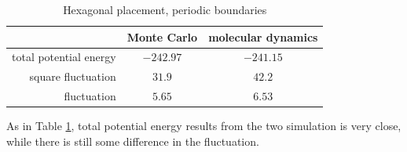 \documentclass[UTF8,a4paper]{article}
\begin{document}
\begin{table}[H]
	\centering
	\caption{Hexagonal placement, periodic boundaries}
	\begin{tabular}{rcc}
		\toprule
		\toprule
		                       & Monte Carlo & molecular dynamics \\ \midrule
		total potential energy & $-242.97$   & $-241.15$          \\
		square fluctuation     & $31.9$      & $42.2$             \\
		fluctuation            & $5.65$      & $6.53$             \\
		\bottomrule
	\end{tabular}%
	\label{tab:hex1}%
\end{table}%
As in Table \ref{tab:hex1}, total potential energy results from the two simulation is very close, while there is still some difference
in the fluctuation.
\end{document}
